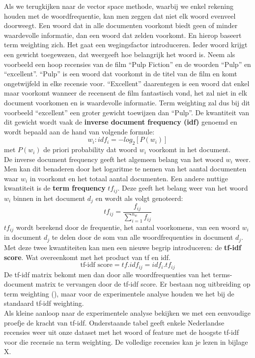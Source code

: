 Als we terugkijken naar de vector space methode, waarbij we enkel rekening houden met de woordfrequentie, kan men zeggen dat niet elk woord evenveel doorweegt. Een woord dat in alle documenten voorkomt biedt geen of minder waardevolle informatie, dan een woord dat zelden voorkomt. En hierop baseert term weighting zich. Het gaat een wegingsfactor introduceren. Ieder woord krijgt een gewicht toegewezen, dat weergeeft hoe belangrijk het woord is. Neem als voorbeeld een hoop recensies van de film ``Pulp Fiction'' en de woorden ``Pulp'' en ``excellent''. ``Pulp'' is een woord dat voorkomt in de titel van de film en komt ongetwijfeld in elke recensie voor. ``Excellent'' daarentegen is een woord dat enkel maar voorkomt wanneer de recensent de film fantastisch vond, het zal niet in elk document voorkomen en is waardevolle informatie. Term weighting zal dus bij dit voorbeeld ``excellent'' een groter gewicht toewijzen dan ``Pulp''. 
%
De kwantiteit van dit gewicht wordt vaak de \textbf{inverse document frequency  (idf)} genoemd en wordt bepaald aan de hand van volgende formule:
\[w_{i}: idf_{i} = -log_{2}[P(w_{i})] \]
met $P(w_{i})$ de priori probability dat woord $w_{i}$ voorkomt in het document.\\
%
De inverse document frequency geeft het algemeen belang van het woord $w_{i}$ weer. Men kan dit benaderen door het logaritme te nemen van het aantal documenten waar $w_{i}$ in voorkomt en het totaal aantal documenten.
Een andere nuttige kwantiteit is de  \textbf{term frequency} $tf_{ij}$. Deze geeft het belang weer van het woord $w_{i}$ binnen in het document $d_{j}$  en wordt als volgt genoteerd:
\[ tf_{ij} = \frac{f_{ij}}{ \sum_{i=1}^{n_{w}}f_{ij}} \]
%
$tf_{ij}$ wordt berekend door de frequentie, het aantal voorkomens, van een woord $w_{i}$ in document $d_{j}$ te delen door de som van alle woordfrequenties in document $d_{j}$.
Met deze twee kwantiteiten kan men een nieuwe begrip introduceren: de \textbf{tf-idf score}. Wat overeenkomt met het product van tf en idf.
\[ \text{tf-idf score} = tf . idf_{ij} = idf_{i} . tf_{ij} \]
%
De tf-idf matrix bekomt men dan door alle woordfrequenties van het terms-document matrix te vervangen door de tf-idf score.
Er bestaan nog uitbreiding op term weighting (\cite{paltoglou2010study}), maar voor de experimentele analyse houden we het bij de standaard tf-idf weighting.\\

Als kleine aanloop naar de experimentele analyse bekijken we met een eenvoudige proefje de kracht van tf-idf. Onderstaande tabel geeft enkele Nederlandse recensies weer uit onze dataset met het woord of feature met de hoogste tf-idf voor die recensie na term weighting. De volledige recensies kan je lezen in bijlage X.

